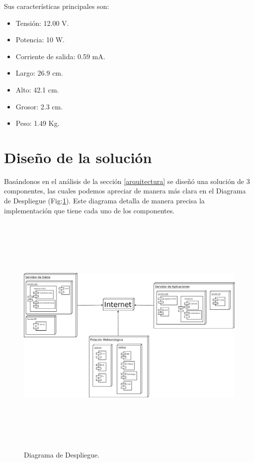 Sus características principales son:
\begin{itemize}
\item Tensión: 12.00 V.
\item Potencia: 10 W.
\item Corriente de salida: 0.59 mA.
\item Largo: 26.9 cm.
\item Alto: 42.1 cm.
\item Grosor: 2.3 cm.
\item Peso: 1.49 Kg.
\end{itemize}

\newpage
\section{Diseño de la solución}
Basándonos en el análisis de la sección \ref{arquitectura} se diseñó una solución de 3 componentes, las cuales podemos apreciar de manera más clara en el Diagrama de Despliegue (Fig:\ref{diagramaDespliegue}). Este diagrama detalla de manera precisa la implementación que tiene cada uno de los componentes.\\

\begin{figure}[h!]
        \centering
        \includegraphics[width=15cm,height=12cm]{images/despliegue}
        \caption{Diagrama de Despliegue.}
	\label{diagramaDespliegue}
\end{figure}


